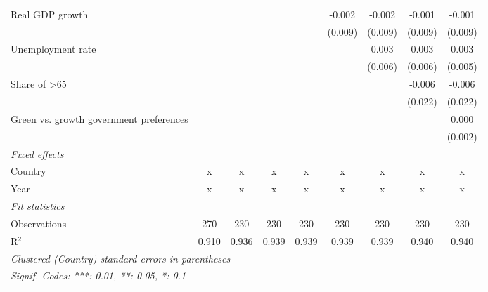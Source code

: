 \begin{table}[htbp]
\begin{tabular}{lcccccccc}
      Real GDP growth                                                  &         &         &               &               & -0.002        & -0.002        & -0.001         & -0.001\\   
                                                                       &         &         &               &               & (0.009)       & (0.009)       & (0.009)        & (0.009)\\   
      Unemployment rate                                                &         &         &               &               &               & 0.003         & 0.003          & 0.003\\   
                                                                       &         &         &               &               &               & (0.006)       & (0.006)        & (0.005)\\   
      Share of >65                                                     &         &         &               &               &               &               & -0.006         & -0.006\\   
                                                                       &         &         &               &               &               &               & (0.022)        & (0.022)\\   
      Green vs. growth government preferences                          &         &         &               &               &               &               &                & 0.000\\   
                                                                       &         &         &               &               &               &               &                & (0.002)\\   
      \emph{Fixed effects}\\
      Country                                                          & x       & x       & x             & x             & x             & x             & x              & x\\  
      Year                                                             & x       & x       & x             & x             & x             & x             & x              & x\\  
      \midrule \emph{Fit statistics}\\
      Observations                                                     & 270     & 230     & 230           & 230           & 230           & 230           & 230            & 230\\  
      R$^2$                                                            & 0.910   & 0.936   & 0.939         & 0.939         & 0.939         & 0.939         & 0.940          & 0.940\\  
      \midrule
      \multicolumn{9}{l}{\emph{Clustered (Country) standard-errors in parentheses}}\\
      \multicolumn{9}{l}{\emph{Signif. Codes: ***: 0.01, **: 0.05, *: 0.1}}\\
   \end{tabular}
\end{table}


